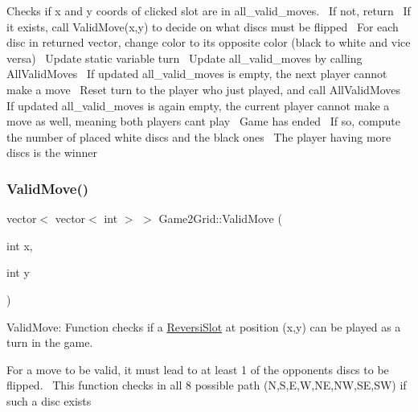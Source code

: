 Checks if x and y coords of clicked slot are in all\+\_\+valid\+\_\+moves.~\newline
If not, return~\newline
If it exists, call Valid\+Move(x,y) to decide on what discs must be flipped~\newline
For each disc in returned vector, change color to its opposite color (black to white and vice versa)~\newline
Update static variable turn~\newline
Update all\+\_\+valid\+\_\+moves by calling All\+Valid\+Moves~\newline
If updated all\+\_\+valid\+\_\+moves is empty, the next player cannot make a move~\newline
Reset turn to the player who just played, and call All\+Valid\+Moves~\newline
If updated all\+\_\+valid\+\_\+moves is again empty, the current player cannot make a move as well, meaning both players can\textquotesingle{}t play~\newline
Game has ended~\newline
If so, compute the number of placed white discs and the black ones~\newline
The player having more discs is the winner \mbox{\label{classGame2Grid_a3505dced106fa8df9285b65a5e02f686}} 
\subsubsection{\texorpdfstring{Valid\+Move()}{ValidMove()}}
{\footnotesize\ttfamily vector$<$ vector$<$ int $>$ $>$ Game2\+Grid\+::\+Valid\+Move (\begin{DoxyParamCaption}\item[{int}]{x,  }\item[{int}]{y }\end{DoxyParamCaption})}



Valid\+Move\+: Function checks if a \hyperlink{classReversiSlot}{Reversi\+Slot} at position (x,y) can be played as a turn in the game. 

For a move to be valid, it must lead to at least 1 of the opponents discs to be flipped.~\newline
This function checks in all 8 possible path (N,S,E,W,NE,NW,SE,SW) if such a disc exists

